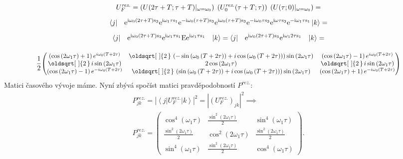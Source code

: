 \documentclass[10pt,a4paper]{article}
\renewcommand*{\sqrt}[2][\ ]{\oldsqrt[#1]{#2\,}\,}
\newcommand{\const}[1]{\text{#1}}
\newcommand{\mat}[1]{
    \begin{pmatrix}
        #1
    \end{pmatrix}
}
\newcommand{\bra}[1]{\left< #1 \right|}
\newcommand{\ket}[1]{\left| #1 \right>}
\newcommand{\e}[1]{\const{e}^{#1}}
\renewcommand{\i}{\const{i}}
\begin{document}
\begin{gather*}
    \\
    U_F^\textit{rez.} =
    \left(U(2\tau + T; \tau + T) |_{\omega=\omega_0}\right) \;
    \left(U_0^\textit{rez.}(\tau + T; \tau)\right) \;
    \left(U(\tau; 0) |_{\omega=\omega_0}\right) =
    \\[5pt]
    \bra{j}
    \;\;\;
    \e{\i\omega_0 (2\tau + T) \const{s}_3}
    \e{\i\omega_1  \tau \const{s}_1}
    \e{-\i\omega_0 (\tau + T) \const{s}_3}
    \e{\i\omega_0 (\tau + T) \const{s}_3}
    \e{-\i\omega_0 \tau \const{s}_3}
    \e{\i\omega \tau \const{s}_3}
    \e{-\i\omega_1 \tau \const{s}_1}
    \ket{k} =
    \\[5pt]
    \bra{j}
    \;\;\;
    \e{\i\omega_0 (2\tau + T) \const{s}_3}
    \e{\i\omega_1  \tau \const{s}_1}
    \const{E}
    \e{\i\omega_1 \tau \const{s}_1}
    \;\;\;
    \ket{k} =
    \bra{j}
    \;\;\;
    \e{\i\omega_0 (2\tau + T) \const{s}_3}
    \e{\i\omega_1 2 \tau \const{s}_1}
    \;\;\;
    \ket{k} =
    \\[10pt]
    \frac{1}{2}
    \scalebox{0.9}{$\mat{\left(\cos{\left(2 \omega_{1} \tau \right)} + 1\right) e^{i \omega_{0} \left(T + 2 \tau\right)} & \sqrt{2} \left(- \sin{\left(\omega_{0} \left(T + 2 \tau\right) \right)} + i \cos{\left(\omega_{0} \left(T + 2 \tau\right) \right)}\right) \sin{\left(2 \omega_{1} \tau \right)} & \left(\cos{\left(2 \omega_{1} \tau \right)} - 1\right) e^{i \omega_{0} \left(T + 2 \tau\right)}\\\sqrt{2} i \sin{\left(2 \omega_{1} \tau \right)} & 2 \cos{\left(2 \omega_{1} \tau \right)} & \sqrt{2} i \sin{\left(2 \omega_{1} \tau \right)}\\\left(\cos{\left(2 \omega_{1} \tau \right)} - 1\right) e^{- i \omega_{0} \left(T + 2 \tau\right)} & \sqrt{2} \left(\sin{\left(\omega_{0} \left(T + 2 \tau\right) \right)} + i \cos{\left(\omega_{0} \left(T + 2 \tau\right) \right)}\right) \sin{\left(2 \omega_{1} \tau \right)} & \left(\cos{\left(2 \omega_{1} \tau \right)} + 1\right) e^{- i \omega_{0} \left(T + 2 \tau\right)}}$}
\end{gather*}
Matici časového vývoje máme. Nyní zbývá spočíst matici pravděpodobností $P^\textit{rez.}$:
\begin{gather*}
    P^\textit{rez.}_{jk}
    =
    \left| \bra{j} U_F^\textit{rez.} \ket{k} \right|^2
    =
    \left|\left( U_F^\textit{rez.} \right)_{jk} \right|^2
    \implies
    \\[10pt]
    P^\textit{rez.}_{jk} =
    \mat{\cos^{4}{\left(\omega_{1} \tau \right)} & \frac{\sin^{2}{\left(2 \omega_{1} \tau \right)}}{2} & \sin^{4}{\left(\omega_{1} \tau \right)}\\\frac{\sin^{2}{\left(2 \omega_{1} \tau \right)}}{2} & \cos^{2}{\left(2 \omega_{1} \tau \right)} & \frac{\sin^{2}{\left(2 \omega_{1} \tau \right)}}{2}\\\sin^{4}{\left(\omega_{1} \tau \right)} & \frac{\sin^{2}{\left(2 \omega_{1} \tau \right)}}{2} & \cos^{4}{\left(\omega_{1} \tau \right)}}.
\end{gather*}
\end{document}

